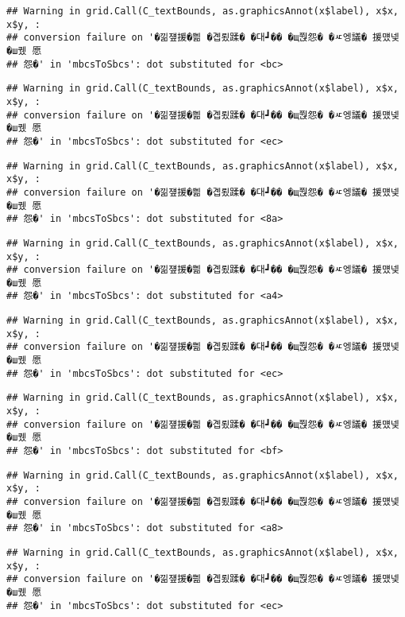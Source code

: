 \documentclass[
]{article}
\begin{document}
\begin{verbatim}
## Warning in grid.Call(C_textBounds, as.graphicsAnnot(x$label), x$x, x$y, :
## conversion failure on '�낆쟾援�쁾 �곕룄蹂� �대┛�� �щ쭩怨� �ㅼ엥議� 援먰넻�ш퀬 愿
## 怨�' in 'mbcsToSbcs': dot substituted for <bc>
\end{verbatim}

\begin{verbatim}
## Warning in grid.Call(C_textBounds, as.graphicsAnnot(x$label), x$x, x$y, :
## conversion failure on '�낆쟾援�쁾 �곕룄蹂� �대┛�� �щ쭩怨� �ㅼ엥議� 援먰넻�ш퀬 愿
## 怨�' in 'mbcsToSbcs': dot substituted for <ec>
\end{verbatim}

\begin{verbatim}
## Warning in grid.Call(C_textBounds, as.graphicsAnnot(x$label), x$x, x$y, :
## conversion failure on '�낆쟾援�쁾 �곕룄蹂� �대┛�� �щ쭩怨� �ㅼ엥議� 援먰넻�ш퀬 愿
## 怨�' in 'mbcsToSbcs': dot substituted for <8a>
\end{verbatim}

\begin{verbatim}
## Warning in grid.Call(C_textBounds, as.graphicsAnnot(x$label), x$x, x$y, :
## conversion failure on '�낆쟾援�쁾 �곕룄蹂� �대┛�� �щ쭩怨� �ㅼ엥議� 援먰넻�ш퀬 愿
## 怨�' in 'mbcsToSbcs': dot substituted for <a4>
\end{verbatim}

\begin{verbatim}
## Warning in grid.Call(C_textBounds, as.graphicsAnnot(x$label), x$x, x$y, :
## conversion failure on '�낆쟾援�쁾 �곕룄蹂� �대┛�� �щ쭩怨� �ㅼ엥議� 援먰넻�ш퀬 愿
## 怨�' in 'mbcsToSbcs': dot substituted for <ec>
\end{verbatim}

\begin{verbatim}
## Warning in grid.Call(C_textBounds, as.graphicsAnnot(x$label), x$x, x$y, :
## conversion failure on '�낆쟾援�쁾 �곕룄蹂� �대┛�� �щ쭩怨� �ㅼ엥議� 援먰넻�ш퀬 愿
## 怨�' in 'mbcsToSbcs': dot substituted for <bf>
\end{verbatim}

\begin{verbatim}
## Warning in grid.Call(C_textBounds, as.graphicsAnnot(x$label), x$x, x$y, :
## conversion failure on '�낆쟾援�쁾 �곕룄蹂� �대┛�� �щ쭩怨� �ㅼ엥議� 援먰넻�ш퀬 愿
## 怨�' in 'mbcsToSbcs': dot substituted for <a8>
\end{verbatim}

\begin{verbatim}
## Warning in grid.Call(C_textBounds, as.graphicsAnnot(x$label), x$x, x$y, :
## conversion failure on '�낆쟾援�쁾 �곕룄蹂� �대┛�� �щ쭩怨� �ㅼ엥議� 援먰넻�ш퀬 愿
## 怨�' in 'mbcsToSbcs': dot substituted for <ec>
\end{verbatim}
\end{document}
